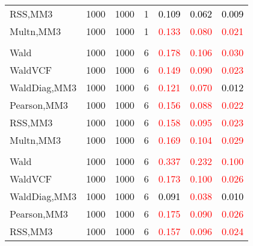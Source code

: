 \documentclass[
]{article}
\begin{document}
\begin{table}[H]
{\begin{tabular}[t]{lrrrrrr}
\hspace{1em}RSS,MM3 & 1000 & 1000 & 1 & \textcolor{black}{0.109} & \textcolor{black}{0.062} & \textcolor{black}{0.009}\\
\hspace{1em}Multn,MM3 & 1000 & 1000 & 1 & \textcolor{red}{0.133} & \textcolor{red}{0.080} & \textcolor{red}{0.021}\\
\addlinespace[0.3em]
\multicolumn{7}{l}{\textbf{1F 15V}}\\
\hspace{1em}Wald & 1000 & 1000 & 6 & \textcolor{red}{0.178} & \textcolor{red}{0.106} & \textcolor{red}{0.030}\\
\hspace{1em}WaldVCF & 1000 & 1000 & 6 & \textcolor{red}{0.149} & \textcolor{red}{0.090} & \textcolor{red}{0.023}\\
\hspace{1em}WaldDiag,MM3 & 1000 & 1000 & 6 & \textcolor{red}{0.121} & \textcolor{red}{0.070} & \textcolor{black}{0.012}\\
\hspace{1em}Pearson,MM3 & 1000 & 1000 & 6 & \textcolor{red}{0.156} & \textcolor{red}{0.088} & \textcolor{red}{0.022}\\
\hspace{1em}RSS,MM3 & 1000 & 1000 & 6 & \textcolor{red}{0.158} & \textcolor{red}{0.095} & \textcolor{red}{0.023}\\
\hspace{1em}Multn,MM3 & 1000 & 1000 & 6 & \textcolor{red}{0.169} & \textcolor{red}{0.104} & \textcolor{red}{0.029}\\
\addlinespace[0.3em]
\multicolumn{7}{l}{\textbf{2F 10V}}\\
\hspace{1em}Wald & 1000 & 1000 & 6 & \textcolor{red}{0.337} & \textcolor{red}{0.232} & \textcolor{red}{0.100}\\
\hspace{1em}WaldVCF & 1000 & 1000 & 6 & \textcolor{red}{0.173} & \textcolor{red}{0.100} & \textcolor{red}{0.026}\\
\hspace{1em}WaldDiag,MM3 & 1000 & 1000 & 6 & \textcolor{black}{0.091} & \textcolor{red}{0.038} & \textcolor{black}{0.010}\\
\hspace{1em}Pearson,MM3 & 1000 & 1000 & 6 & \textcolor{red}{0.175} & \textcolor{red}{0.090} & \textcolor{red}{0.026}\\
\hspace{1em}RSS,MM3 & 1000 & 1000 & 6 & \textcolor{red}{0.157} & \textcolor{red}{0.096} & \textcolor{red}{0.024}\\

\end{tabular}}
\end{table}
\end{document}
